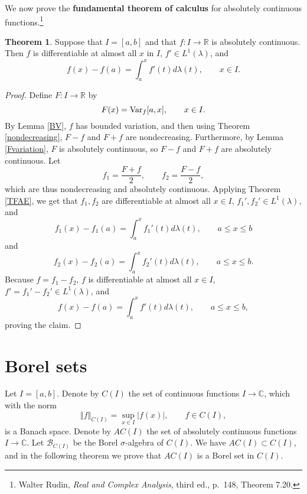 \documentclass{article}
\newcommand{\Var}{\ensuremath\mathrm{Var}}
\newcommand{\norm}[1]{\left\Vert #1 \right\Vert}
\theoremstyle{definition}
\newtheorem{theorem}{Theorem}
\theoremstyle{definition}
\begin{document}
We now prove the \textbf{fundamental theorem of calculus} for absolutely continuous functions.\footnote{Walter Rudin, {\em Real and Complex Analysis}, third ed., p.~148, Theorem 7.20.}

\begin{theorem}
Suppose that $I=[a,b]$ and that $f:I \to \mathbb{R}$ is absolutely continuous. Then
$f$ is differentiable at almost all $x$ in $I$, $f' \in L^1(\lambda)$, and
\[
f(x)-f(a) = \int_a^x f'(t) d\lambda(t), \qquad x \in I.
\]
\label{FTOC}
\end{theorem}
\begin{proof}
Define
$F:I \to \mathbb{R}$  by
\[
F(x)=\Var_f[a,x], \qquad x \in I.
\]
By Lemma \ref{BV}, $f$ has bounded variation, and then using Theorem \ref{nondecreasing}, $F-f$ and $F+f$ are nondecreasing. 
Furthermore, by Lemma \ref{Fvariation}, $F$ is absolutely continuous, so $F-f$ and $F+f$ are absolutely continuous.
Let
\[
f_1 = \frac{F+f}{2}, \qquad f_2 = \frac{F-f}{2},
\]
which are thus nondecreasing and absolutely continuous.
Applying Theorem \ref{TFAE}, we get that $f_1,f_2$
are differentiable at almost all $x \in I$, $f_1',f_2' \in L^1(\lambda)$, and 
\[
f_1(x)-f_1(a)=\int_a^x f_1'(t) d\lambda(t), \qquad a \leq x \leq b
\]
and
\[
f_2(x)-f_2(a)=\int_a^x f_2'(t) d\lambda(t), \qquad a \leq x \leq b.
\]
Because $f=f_1-f_2$, $f$ is differentiable at almost all $x \in I$, $f'=f_1'-f_2' \in L^1(\lambda)$,
and
\[
f(x) - f(a) = \int_a^x f'(t) d\lambda(t), \qquad a \leq x \leq b,
\]
proving the claim.
\end{proof}


\section{Borel sets}
Let $I=[a,b]$.
Denote by $C(I)$ the set of continuous functions $I \to \mathbb{C}$, which with the norm
\[
\norm{f}_{C(I)} = \sup_{x \in I} |f(x)|, \qquad f \in C(I),
\]
is a Banach space. 
Denote by  $AC(I)$ the set of absolutely continuous functions $I \to \mathbb{C}$. 
Let $\mathscr{B}_{C(I)}$ be the Borel $\sigma$-algebra of $C(I)$. We have $AC(I) \subset C(I)$, and in the following
theorem we prove that $AC(I)$ is a Borel set in $C(I)$. 
\end{document}
